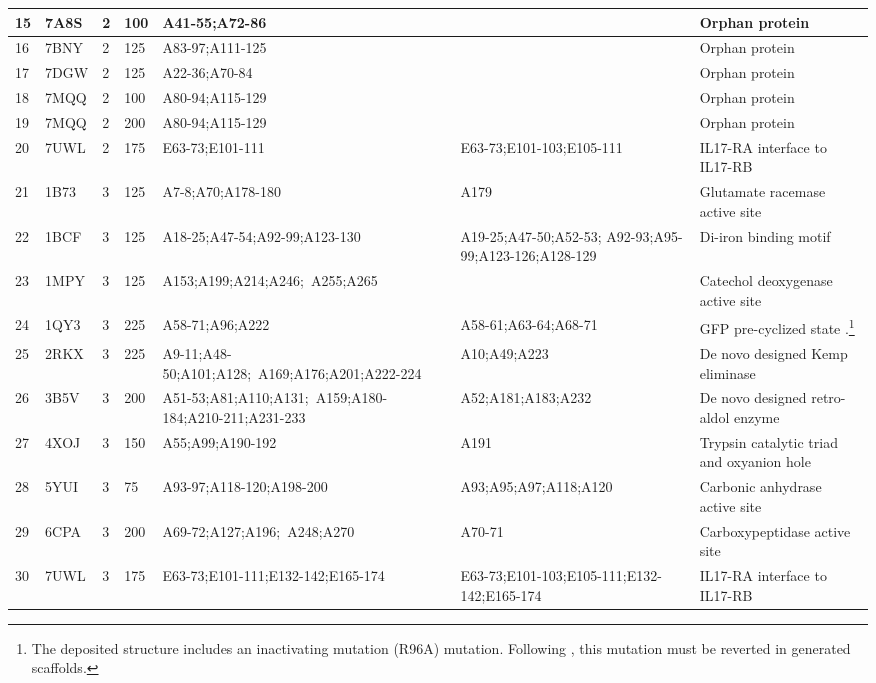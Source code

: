 \begin{footnotesize}
\begin{table}[htbp]
\begin{tabularx}{\textwidth}{|l|l|l|l|p{3.2cm}|p{3.3cm}|p{3.2cm}|}
15  & 7A8S & 2 & 100 & A41-55;A72-86 &  & Orphan protein \citep{wu2022omegafold} \\ \hline
16  & 7BNY & 2 & 125 & A83-97;A111-125 &  & Orphan protein \citep{wu2022omegafold} \\ \hline
17  & 7DGW & 2 & 125 & A22-36;A70-84 &  & Orphan protein \citep{wu2022omegafold} \\ \hline
18  & 7MQQ & 2 & 100 & A80-94;A115-129 & & Orphan protein \citep{wu2022omegafold} \\ \hline
19  & 7MQQ & 2 & 200 & A80-94;A115-129 &  & Orphan protein \citep{wu2022omegafold} \\ \hline
20  & 7UWL & 2 &  175 & E63-73;E101-111 & E63-73;E101-103;E105-111 & IL17-RA interface to IL17-RB \citep{wilson2022organizing} \\ \hline
\hline
21  & 1B73 & 3 & 125 & A7-8;A70;A178-180 & A179 & Glutamate racemase active site \citep{ribeiro2018mechanism} \\ \hline
22  & 1BCF & 3 & 125 & A18-25;A47-54;A92-99;A123-130  & A19-25;A47-50;A52-53; A92-93;A95-99;A123-126;A128-129 & Di-iron binding motif \citep{watson2022broadly} \\ \hline
23  & 1MPY & 3 & 125 & A153;A199;A214;A246;\ A255;A265 & & Catechol deoxygenase active site \citep{ribeiro2018mechanism} \\ \hline
24  & 1QY3 & 3 & 225 & A58-71;A96;A222  & A58-61;A63-64;A68-71  & GFP pre-cyclized state \citep{hayes2024simulating}.\footnote{The deposited structure includes an inactivating mutation (R96A) mutation.  Following \citep{hayes2024simulating}, this mutation must be reverted in generated scaffolds.} \\ \hline
25  & 2RKX & 3 & 225 & A9-11;A48-50;A101;A128;\ A169;A176;A201;A222-224 & A10;A49;A223 & De novo designed Kemp eliminase \citep{rothlisberger2008kemp} \\ \hline
26  & 3B5V & 3 & 200 & A51-53;A81;A110;A131;\ A159;A180-184;A210-211;A231-233 & A52;A181;A183;A232 & De novo designed retro-aldol enzyme \citep{jiang2008novo} \\ \hline
27  & 4XOJ & 3 & 150 & A55;A99;A190-192 & A191  & Trypsin catalytic triad and oxyanion hole \citep{du2024conformational} \\ \hline
28  & 5YUI & 3 & 75 & A93-97;A118-120;A198-200 & A93;A95;A97;A118;A120  & Carbonic anhydrase active site \citep{watson2022broadly} \\ \hline
29  & 6CPA & 3 & 200 & A69-72;A127;A196;\ A248;A270 & A70-71 & Carboxypeptidase active site \citep{ribeiro2018mechanism} \\ \hline
30  & 7UWL & 3 & 175 & E63-73;E101-111;E132-142;E165-174 & E63-73;E101-103;E105-111;E132-142;E165-174 & IL17-RA interface to IL17-RB \citep{wilson2022organizing} \\ \hline
\end{tabularx}
\end{table}
\end{footnotesize}

